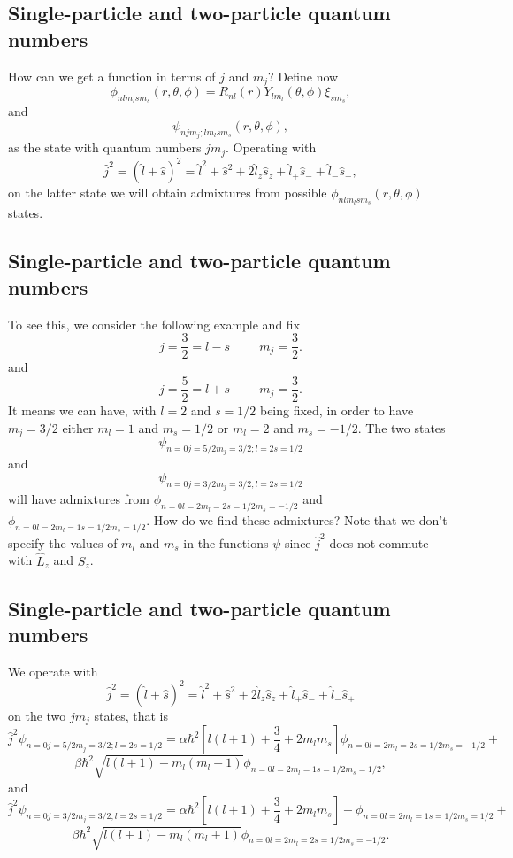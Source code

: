 \documentclass[%
twoside,                 %
final,                   %
10pt]{article}
\begin{document}
\subsection{Single-particle and two-particle quantum numbers}
\begin{block}{}
How can we get a function in terms of $j$ and $m_j$?
Define now
\[
\phi_{nlm_lsm_s}(r,\theta,\phi)=R_{nl}(r)Y_{lm_l}(\theta,\phi)\xi_{sm_s},
\]
and
\[
\psi_{njm_j;lm_lsm_s}(r,\theta,\phi),
\]
as the state with quantum numbers $jm_j$.
Operating with 
\[
   \hat{j}^2=(\hat{l}+\hat{s})^2=\hat{l}^2+\hat{s}^2+2\hat{l}_z\hat{s}_z+\hat{l}_+\hat{s}_{-}+\hat{l}_{-}\hat{s}_{+},
\]
on the latter state we will obtain admixtures from possible $\phi_{nlm_lsm_s}(r,\theta,\phi)$ states.
\end{block}


\subsection{Single-particle and two-particle quantum numbers}
\begin{block}{}
To see this, we consider the following example and fix
\[
j=\frac{3}{2}=l-s\hspace{1cm} m_j=\frac{3}{2}.
\]
and
\[
j=\frac{5}{2}=l+s\hspace{1cm} m_j=\frac{3}{2}.
\]
It means we can have, with $l=2$ and $s=1/2$ being fixed, in order to have $m_j=3/2$ either $m_l=1$ and $m_s=1/2$ or
$m_l=2$ and $m_s=-1/2$. The two states    
\[
\psi_{n=0j=5/2m_j=3/2;l=2s=1/2}
\]
and
\[
\psi_{n=0j=3/2m_j=3/2;l=2s=1/2}
\]
will have admixtures from $\phi_{n=0l=2m_l=2s=1/2m_s=-1/2}$ and $\phi_{n=0l=2m_l=1s=1/2m_s=1/2}$. 
How do we find these admixtures? Note that we don't specify the values of $m_l$ and $m_s$ 
in the functions $\psi$ since    
$\hat{j}^2$ does not commute with $\hat{L}_z$ and $\hat{S}_z$. 
\end{block}

\subsection{Single-particle and two-particle quantum numbers}
\begin{block}{}
We operate with 
\[
   \hat{j}^2=(\hat{l}+\hat{s})^2=\hat{l}^2+\hat{s}^2+2\hat{l}_z\hat{s}_z+\hat{l}_+\hat{s}_{-}+\hat{l}_{-}\hat{s}_{+}
\]
on the two $jm_j$ states, that is
\[
\hat{j}^2\psi_{n=0j=5/2m_j=3/2;l=2s=1/2}= \alpha\hbar^2[l(l+1)+\frac{3}{4}+2m_lm_s]\phi_{n=0l=2m_l=2s=1/2m_s=-1/2}+
\]
\[
\beta\hbar^2\sqrt{l(l+1)-m_l(m_l-1)}\phi_{n=0l=2m_l=1s=1/2m_s=1/2},
\]
and
\[
\hat{j}^2\psi_{n=0j=3/2m_j=3/2;l=2s=1/2}= \alpha\hbar^2[l(l+1)+\frac{3}{4}+2m_lm_s]+ \phi_{n=0l=2m_l=1s=1/2m_s=1/2}+
\]
\[
\beta\hbar^2\sqrt{l(l+1)-m_l(m_l+1)}\phi_{n=0l=2m_l=2s=1/2m_s=-1/2}.
\]
\end{block}
\end{document}
